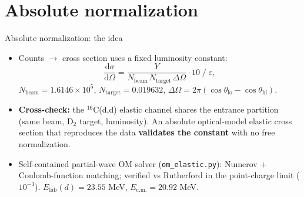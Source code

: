 \documentclass[aspectratio=169,11pt]{beamer}
\newcommand{\Cs}{$^{16}$C}
\begin{document}
\section{Absolute normalization}

\begin{frame}{Absolute normalization: the idea}
  \begin{itemize}
    \item Counts $\to$ cross section uses a fixed luminosity constant:
      \[
        \frac{\mathrm{d}\sigma}{\mathrm{d}\Omega}
        = \frac{Y}{N_{\mathrm{beam}}\,N_{\mathrm{target}}\,\Delta\Omega}\cdot 10
          \;\Big/\;\varepsilon ,
      \]
      $N_{\mathrm{beam}}=1.6146\times10^{5}$, $N_{\mathrm{target}}=0.019632$,
      $\Delta\Omega = 2\pi(\cos\theta_{\mathrm{lo}}-\cos\theta_{\mathrm{hi}})$.
    \item \textbf{Cross-check:} the \Cs(d,d) elastic channel shares the entrance
      partition (same beam, D$_2$ target, luminosity). An absolute optical-model
      elastic cross section that reproduces the data \textbf{validates the constant}
      with no free normalization.
    \item Self-contained partial-wave OM solver (\texttt{om\_elastic.py}):
      Numerov $+$ Coulomb-function matching; verified vs Rutherford in the
      point-charge limit ($10^{-3}$). $E_{\mathrm{lab}}(d)=23.55$ MeV,
      $E_{\mathrm{c.m.}}=20.92$ MeV.
  \end{itemize}
\end{frame}
\end{document}
